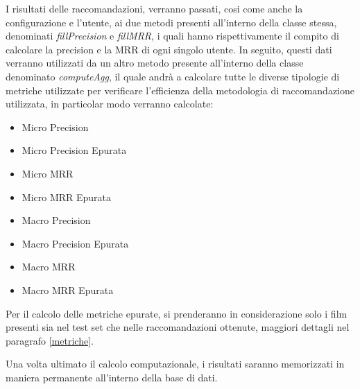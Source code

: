 I risultati delle raccomandazioni, verranno passati, cosi come anche la configurazione e l'utente, ai due metodi presenti all'interno della classe stessa, denominati \emph{fillPrecision} e \emph{fillMRR}, i quali hanno rispettivamente il compito di calcolare la precision e la MRR di ogni singolo utente. In seguito, questi dati verranno utilizzati da un altro metodo presente all'interno della classe denominato \emph{computeAgg}, il quale andrà a calcolare tutte le diverse tipologie di metriche utilizzate per verificare l'efficienza della metodologia di raccomandazione utilizzata, in particolar modo verranno calcolate: 
\begin{multicols}{2}
\begin{itemize}
	\item Micro Precision
	\item Micro Precision Epurata
	\item Micro MRR
	\item Micro MRR Epurata 
	\item Macro Precision
	\item Macro Precision Epurata 
	\item Macro MRR
	\item Macro MRR Epurata 
\end{itemize}
\end{multicols}
Per il calcolo delle metriche epurate, si prenderanno in considerazione solo i film presenti sia nel test set che nelle raccomandazioni ottenute, maggiori dettagli nel paragrafo \ref{metriche}.

Una volta ultimato il calcolo computazionale, i risultati saranno memorizzati in maniera permanente all'interno della base di dati.
